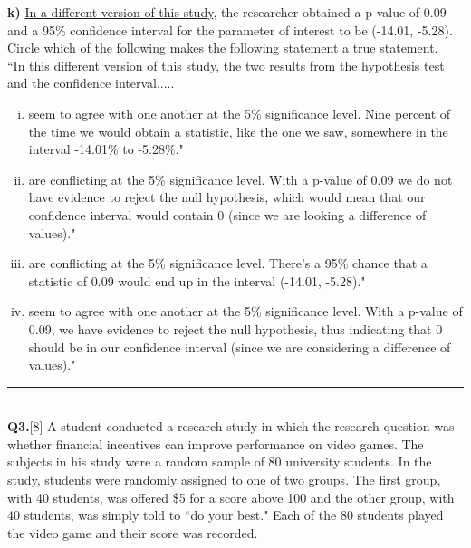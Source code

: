 \documentclass[12pt, oneside]{article}
\newcommand{\noi}{\noindent}
\begin{document}
\pagebreak


\noi
{\bf k)} \underline{In a different version of this study}, the researcher obtained a p-value of 0.09 and a 95\% confidence interval for the parameter of interest to be (-14.01, -5.28). Circle which of the following makes the following statement a true statement. \\

\noi
``In this different version of this study, the two results from the hypothesis test and the confidence interval.....
\begin{enumerate} [(i)]
\item seem to agree with one another at the 5\% significance level. Nine percent of the time we would obtain a statistic, like the one we saw, somewhere in the interval -14.01\% to -5.28\%."
\item are conflicting at the 5\% significance level. With a p-value of 0.09 we do not have evidence to reject the null hypothesis, which would mean that our confidence interval would contain 0 (since we are looking a difference of values)."
\item are conflicting at the 5\% significance level. There's a 95\% chance that a statistic of 0.09 would end up in the interval (-14.01, -5.28)."
\item seem to agree with one another at the 5\% significance level. With a p-value of 0.09, we have evidence to reject the null hypothesis, thus indicating that 0 should be in our confidence interval (since we are considering a difference of values)."
\end{enumerate}
\vspace{0.15in}


\noi
\rule{7.5in}{.02in} \\
\noi
{\bf Q3.}[8] A student conducted a research study in which the research question was whether financial incentives can improve performance on video games. The subjects in his study were a random sample of 80 university students. In the study, students were randomly assigned to one of two groups. The first group, with 40 students, was offered \$5 for a score above 100 and the other group, with 40 students, was simply told to ``do your best." Each of the 80 students played the video game and their score was recorded.\\
\end{document}
